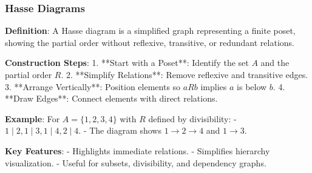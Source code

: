 \subsubsection*{Hasse Diagrams}

\textbf{Definition}: A Hasse diagram is a simplified graph representing a finite poset, showing the partial order without reflexive, transitive, or redundant relations.

\textbf{Construction Steps}:
1. **Start with a Poset**: Identify the set $A$ and the partial order $R$.
2. **Simplify Relations**: Remove reflexive and transitive edges.
3. **Arrange Vertically**: Position elements so $a R b$ implies $a$ is below $b$.
4. **Draw Edges**: Connect elements with direct relations.

\textbf{Example}:  
For $A = \{1, 2, 3, 4\}$ with $R$ defined by divisibility:  
- $1 \mid 2, 1 \mid 3, 1 \mid 4, 2 \mid 4$.  
- The diagram shows $1 \to 2 \to 4$ and $1 \to 3$.

\textbf{Key Features}:
- Highlights immediate relations.
- Simplifies hierarchy visualization.
- Useful for subsets, divisibility, and dependency graphs.